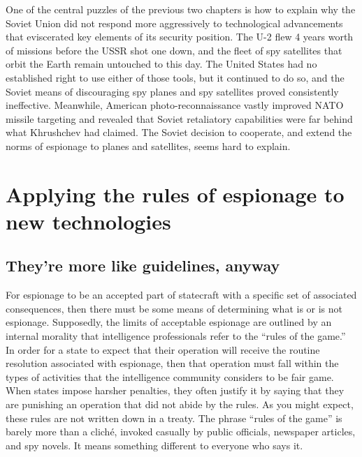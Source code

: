 \documentclass{report}
\begin{document}

One of the central puzzles of the previous two chapters is how to explain why the Soviet Union did not respond more aggressively to technological advancements that eviscerated key elements of its security position. The U-2 flew 4 years worth of missions before the USSR shot one down, and the fleet of spy satellites that orbit the Earth remain untouched to this day. The United States had no established right to use either of those tools, but it continued to do so, and the Soviet means of discouraging spy planes and spy satellites proved consistently ineffective. Meanwhile, American photo-reconnaissance vastly improved NATO missile targeting and revealed that Soviet retaliatory capabilities were far behind what Khrushchev had claimed. The Soviet decision to cooperate, and extend the norms of espionage to planes and satellites, seems hard to explain.


\section{Applying the rules of espionage to new technologies}
\subsection{They're more like guidelines, anyway}
For espionage to be an accepted part of statecraft with a specific set of associated consequences, then there must be some means of determining what is or is not espionage. Supposedly, the limits of acceptable espionage are outlined by an internal morality that intelligence professionals refer to the ``rules of the game.'' In order for a state to expect that their operation will receive the routine resolution associated with espionage, then that operation must fall within the types of activities that the intelligence community considers to be fair game. When states impose harsher penalties, they often justify it by saying that they are punishing an operation that did not abide by the rules. As you might expect, these rules are not written down in a treaty. The phrase ``rules of the game'' is barely more than a clich\'e, invoked casually by public officials, newspaper articles, and spy novels. It means something different to everyone who says it.
\end{document}
